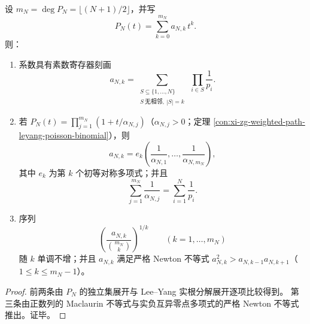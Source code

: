 \begin{proposition}\label{prop:xi-prime-hardcore-newton-maclaurin}
设 \(m_N=\deg P_N=\lfloor(N+1)/2\rfloor\)，并写
\[
P_N(t)=\sum_{k=0}^{m_N}a_{N,k}\,t^k.
\]
则：
\begin{enumerate}
  \item 系数具有素数寄存器刻画
  \[
  a_{N,k}
  =\sum_{\substack{S\subseteq\{1,\dots,N\}\\ S\ \mathrm{无相邻},\ |S|=k}}
  \ \prod_{i\in S}\frac1{p_i}.
  \]
  \item 若 \(P_N(t)=\prod_{j=1}^{m_N}(1+t/\alpha_{N,j})\)（\(\alpha_{N,j}>0\)；定理 \ref{con:xi-zg-weighted-path-leyang-poisson-binomial}），则
  \[
  a_{N,k}=e_k\!\left(\frac{1}{\alpha_{N,1}},\dots,\frac{1}{\alpha_{N,m_N}}\right),
  \]
  其中 \(e_k\) 为第 \(k\) 个初等对称多项式；并且
  \[
  \sum_{j=1}^{m_N}\frac{1}{\alpha_{N,j}}=\sum_{i=1}^{N}\frac{1}{p_i}.
  \]
  \item 序列
  \[
  \left(\frac{a_{N,k}}{\binom{m_N}{k}}\right)^{1/k}\qquad(k=1,\dots,m_N)
  \]
  随 \(k\) 单调不增；并且 \(a_{N,k}\) 满足严格 Newton 不等式 \(a_{N,k}^2>a_{N,k-1}a_{N,k+1}\)（\(1\le k\le m_N-1\)）。
\end{enumerate}
\end{proposition}
\begin{proof}
前两条由 \(P_N\) 的独立集展开与 Lee--Yang 实根分解展开逐项比较得到。
第三条由正数列的 Maclaurin 不等式与实负互异零点多项式的严格 Newton 不等式推出。证毕。
\end{proof}
